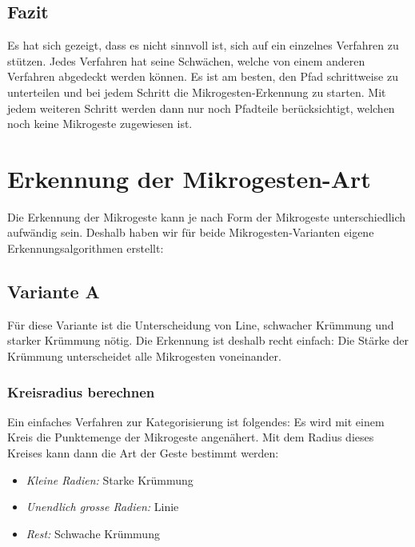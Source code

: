 \subsection{Fazit}
Es hat sich gezeigt, dass es nicht sinnvoll ist, sich auf ein einzelnes Verfahren zu stützen. Jedes Verfahren hat seine Schwächen, welche von einem anderen Verfahren abgedeckt werden können. Es ist am besten, den Pfad schrittweise zu unterteilen und bei jedem Schritt die Mikrogesten-Erkennung zu starten. Mit jedem weiteren Schritt werden dann nur noch Pfadteile berücksichtigt, welchen noch keine Mikrogeste zugewiesen ist.


\section{Erkennung der Mikrogesten-Art}
Die Erkennung der Mikrogeste kann je nach Form der Mikrogeste unterschiedlich aufwändig sein. Deshalb haben wir für beide Mikrogesten-Varianten eigene Erkennungsalgorithmen erstellt:

\subsection{Variante A}
Für diese Variante ist die Unterscheidung von Line, schwacher Krümmung und starker Krümmung nötig. Die Erkennung ist deshalb recht einfach: Die Stärke der Krümmung unterscheidet alle Mikrogesten voneinander.

\subsubsection{Kreisradius berechnen}
Ein einfaches Verfahren zur Kategorisierung ist folgendes: Es wird mit einem Kreis die Punktemenge der Mikrogeste angenähert. Mit dem Radius dieses Kreises kann dann die Art der Geste bestimmt werden:
\begin{itemize}
\item \emph{Kleine Radien:} Starke Krümmung
\item \emph{Unendlich grosse Radien:} Linie
\item \emph{Rest:} Schwache Krümmung
\end{itemize}

